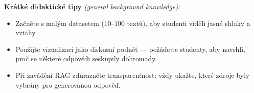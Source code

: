 \noindent\textbf{Krátké didaktické tipy} \emph{(general background knowledge)}:
\begin{itemize}
  \item Začněte s malým datasetem (10–100 textů), aby studenti viděli jasné shluky a vztahy.
  \item Použijte vizualizaci jako diskusní podnět — požádejte studenty, aby navrhli, proč se některé odpovědi seskupily dohromady.
  \item Při zavádění RAG zdůrazněte transparentnost: vždy ukažte, které zdroje byly vybrány pro generovanou odpověď.
\end{itemize}